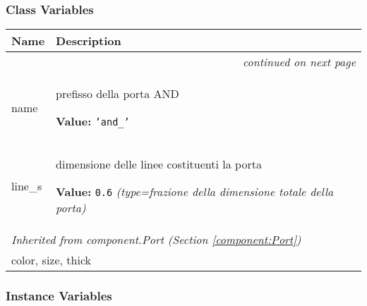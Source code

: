 
  \subsubsection{Class Variables}

    \vspace{-1cm}
\hspace{\varindent}\begin{longtable}{|p{\varnamewidth}|p{\vardescrwidth}|l}
\cline{1-2}
\cline{1-2} \centering \textbf{Name} & \centering \textbf{Description}& \\
\cline{1-2}
\endhead\cline{1-2}\multicolumn{3}{r}{\small\textit{continued on next page}}\\\endfoot\cline{1-2}
\endlastfoot\raggedright n\-a\-m\-e\- & \raggedright prefisso della porta AND

\textbf{Value:} 
{\tt \texttt{'}\texttt{and\_}\texttt{'}}&\\
\cline{1-2}
\raggedright l\-i\-n\-e\-\_\-s\- & \raggedright dimensione delle linee costituenti la porta

\textbf{Value:} 
{\tt 0.6}            {\it (type=frazione della dimensione totale della porta)}&\\
\cline{1-2}
\multicolumn{2}{|l|}{\textit{Inherited from component.Port \textit{(Section \ref{component:Port})}}}\\
\multicolumn{2}{|p{\varwidth}|}{\raggedright color, size, thick}\\
\cline{1-2}
\end{longtable}



  \subsubsection{Instance Variables}

